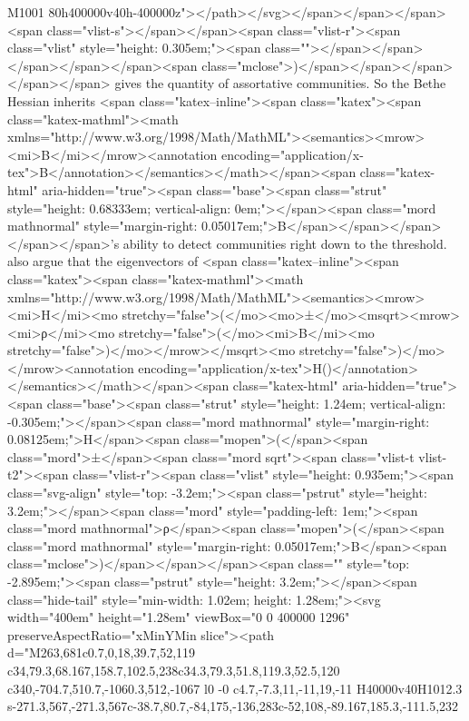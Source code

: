 M1001 80h400000v40h-400000z"></path></svg></span></span></span><span class="vlist-s">​</span></span><span class="vlist-r"><span class="vlist" style="height: 0.305em;"><span class=""></span></span></span></span></span><span class="mclose">)</span></span></span></span></span> gives the quantity of assortative communities. So the Bethe Hessian inherits <span class="katex--inline"><span class="katex"><span class="katex-mathml"><math xmlns="http://www.w3.org/1998/Math/MathML"><semantics><mrow><mi>B</mi></mrow><annotation encoding="application/x-tex">B</annotation></semantics></math></span><span class="katex-html" aria-hidden="true"><span class="base"><span class="strut" style="height: 0.68333em; vertical-align: 0em;"></span><span class="mord mathnormal" style="margin-right: 0.05017em;">B</span></span></span></span></span>'s ability to detect communities right down to the threshold. \cite{SaadeBethe} also argue that the eigenvectors of <span class="katex--inline"><span class="katex"><span class="katex-mathml"><math xmlns="http://www.w3.org/1998/Math/MathML"><semantics><mrow><mi>H</mi><mo stretchy="false">(</mo><mo>±</mo><msqrt><mrow><mi>ρ</mi><mo stretchy="false">(</mo><mi>B</mi><mo stretchy="false">)</mo></mrow></msqrt><mo stretchy="false">)</mo></mrow><annotation encoding="application/x-tex">H(\pm {})</annotation></semantics></math></span><span class="katex-html" aria-hidden="true"><span class="base"><span class="strut" style="height: 1.24em; vertical-align: -0.305em;"></span><span class="mord mathnormal" style="margin-right: 0.08125em;">H</span><span class="mopen">(</span><span class="mord">±</span><span class="mord sqrt"><span class="vlist-t vlist-t2"><span class="vlist-r"><span class="vlist" style="height: 0.935em;"><span class="svg-align" style="top: -3.2em;"><span class="pstrut" style="height: 3.2em;"></span><span class="mord" style="padding-left: 1em;"><span class="mord mathnormal">ρ</span><span class="mopen">(</span><span class="mord mathnormal" style="margin-right: 0.05017em;">B</span><span class="mclose">)</span></span></span><span class="" style="top: -2.895em;"><span class="pstrut" style="height: 3.2em;"></span><span class="hide-tail" style="min-width: 1.02em; height: 1.28em;"><svg width="400em" height="1.28em" viewBox="0 0 400000 1296" preserveAspectRatio="xMinYMin slice"><path d="M263,681c0.7,0,18,39.7,52,119
c34,79.3,68.167,158.7,102.5,238c34.3,79.3,51.8,119.3,52.5,120
c340,-704.7,510.7,-1060.3,512,-1067
l0 -0
c4.7,-7.3,11,-11,19,-11
H40000v40H1012.3
s-271.3,567,-271.3,567c-38.7,80.7,-84,175,-136,283c-52,108,-89.167,185.3,-111.5,232
